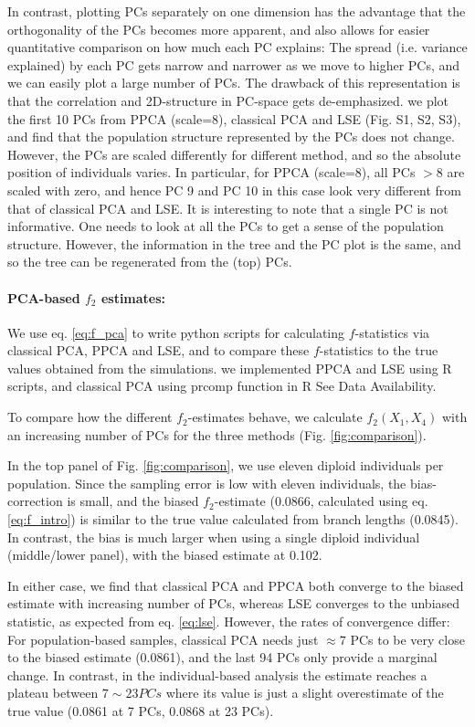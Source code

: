 \documentclass[12pt]{article}
\begin{document}
In contrast, plotting PCs separately on one dimension has the advantage that the orthogonality of the PCs becomes more apparent, and also allows for easier quantitative comparison on how much each PC explains: The spread (i.e. variance explained) by each PC gets narrow and narrower as we move to higher PCs, and we can easily plot a large number of PCs. The drawback of this representation is that the correlation and 2D-structure in PC-space gets de-emphasized. we plot the first 10 PCs from PPCA (scale=8), classical PCA and LSE (Fig. S1, S2, S3), and find that the population structure represented by the PCs does not change. However, the PCs are scaled differently for different method, and so the absolute position of individuals varies. In particular, for PPCA (scale=8), all PCs $>8$ are scaled with zero, and hence PC 9 and PC 10 in this case look very different from that of classical PCA and LSE.     
It is interesting to note that a single PC is not informative. One needs to look at all the PCs to get a sense of the population structure. However, the information in the tree and the PC plot is the same, and so the tree can be regenerated from the (top) PCs. 

\paragraph{PCA-based $f_2$ estimates:}
We use eq. \ref{eq:f_pca} to write python scripts for calculating $f$-statistics via classical PCA, PPCA and LSE, and to compare these $f$-statistics to the true values obtained from  the simulations. we implemented PPCA and LSE using R scripts, and classical PCA using prcomp function in R See Data Availability. 

To compare how the different $f_2$-estimates behave, we calculate $f_2(X_1, X_4)$  with an increasing number of PCs for the three methods (Fig. \ref{fig:comparison}).  

In the top panel of Fig. \ref{fig:comparison}, we use eleven diploid individuals per population. Since the sampling error is low with eleven individuals, the bias-correction is small, and the biased $f_2$-estimate (0.0866, calculated using eq. \ref{eq:f_intro}) is similar to the true value calculated from branch lengths (0.0845). In contrast, the bias is much larger when using a single diploid individual (middle/lower panel), with the biased estimate at 0.102. 

In either case, we find that classical PCA and PPCA both converge to the biased estimate with increasing number of PCs, whereas LSE converges to the unbiased statistic, as expected from eq. \ref{eq:lse}. However, the rates of convergence differ: For population-based samples, classical PCA needs just $\approx 7$ PCs to be very close to the biased estimate (0.0861), and the last 94 PCs only provide a marginal change. In contrast, in the individual-based analysis the estimate reaches a plateau between $7 \sim 23 PCs$ where its value is just a slight overestimate of the true value (0.0861 at 7 PCs, 0.0868 at 23 PCs).
\end{document}
